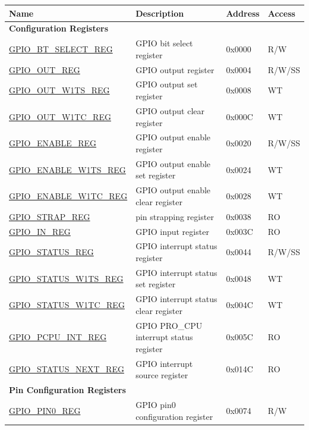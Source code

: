 \begin{longtable}{ | p{6cm} | p{7.2cm} | p{1.3cm} | p{1cm} | }
\hline\rowcolor{lightgray}
Name & Description &  Address & Access \\ \hline
\endhead
\multicolumn{4}{|l|}{\textbf{Configuration Registers}} \\ \hline
\hyperref[regdesc:GPIOBTSELECTREG]{GPIO\_BT\_SELECT\_REG} & GPIO bit select register & 0x0000 & R/W \\ \hline
\hyperref[regdesc:GPIOOUTREG]{GPIO\_OUT\_REG} & GPIO output register & 0x0004 & R/W/SS \\ \hline
\hyperref[regdesc:GPIOOUTW1TSREG]{GPIO\_OUT\_W1TS\_REG} & GPIO output set register & 0x0008 & WT \\ \hline
\hyperref[regdesc:GPIOOUTW1TCREG]{GPIO\_OUT\_W1TC\_REG} & GPIO output clear register & 0x000C & WT \\ \hline
\hyperref[regdesc:GPIOENABLEREG]{GPIO\_ENABLE\_REG} & GPIO output enable register & 0x0020 & R/W/SS \\ \hline
\hyperref[regdesc:GPIOENABLEW1TSREG]{GPIO\_ENABLE\_W1TS\_REG} & GPIO output enable set register & 0x0024 & WT \\ \hline
\hyperref[regdesc:GPIOENABLEW1TCREG]{GPIO\_ENABLE\_W1TC\_REG} & GPIO output enable clear register & 0x0028 & WT \\ \hline
\hyperref[regdesc:GPIOSTRAPREG]{GPIO\_STRAP\_REG} & pin strapping register & 0x0038 & RO \\ \hline
\hyperref[regdesc:GPIOINREG]{GPIO\_IN\_REG} & GPIO input register & 0x003C & RO \\ \hline
\hyperref[regdesc:GPIOSTATUSREG]{GPIO\_STATUS\_REG} & GPIO interrupt status register & 0x0044 & R/W/SS \\ \hline
\hyperref[regdesc:GPIOSTATUSW1TSREG]{GPIO\_STATUS\_W1TS\_REG} & GPIO interrupt status set register & 0x0048 & WT \\ \hline
\hyperref[regdesc:GPIOSTATUSW1TCREG]{GPIO\_STATUS\_W1TC\_REG} & GPIO interrupt status clear register & 0x004C & WT \\ \hline
\hyperref[regdesc:GPIOPCPUINTREG]{GPIO\_PCPU\_INT\_REG} & GPIO PRO\_CPU interrupt status register & 0x005C & RO \\ \hline
\hyperref[regdesc:GPIOSTATUSNEXTREG]{GPIO\_STATUS\_NEXT\_REG} & GPIO interrupt source register & 0x014C & RO \\ \hline
\multicolumn{4}{|l|}{\textbf{Pin Configuration Registers}} \\ \hline
\hyperref[regdesc:GPIOPINNREG]{GPIO\_PIN0\_REG} & GPIO pin0 configuration register & 0x0074 & R/W \\ \hline

\end{longtable}
